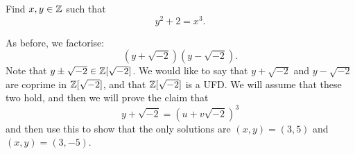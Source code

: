 \begin{problem}
	Find $x,y \in \mathbb{Z}$ such that \[
		y^2 + 2 = x^3.
	\]
\end{problem}

\begin{solution}
	As before, we factorise: \[
		\left( y + \sqrt{-2} \right) \left( y - \sqrt{-2} \right).
	\]
	Note that $y \pm \sqrt{-2} \in \mathbb{Z}[\sqrt{-2}]$.
	We would like to say that $y + \sqrt{-2}$ and $y - \sqrt{-2}$ are
	coprime in $\mathbb{Z}[\sqrt{-2}]$, and that $\mathbb{Z}[\sqrt{-2}]$ is a UFD.
	We will assume that these two hold, and then we will prove the claim that \[
		y + \sqrt{-2} = (u + v\sqrt{-2})^3
	\]
	and then use this to show that the only solutions are
	$(x,y) = (3,5)$ and $(x,y) = (3,-5)$.
\end{solution}

